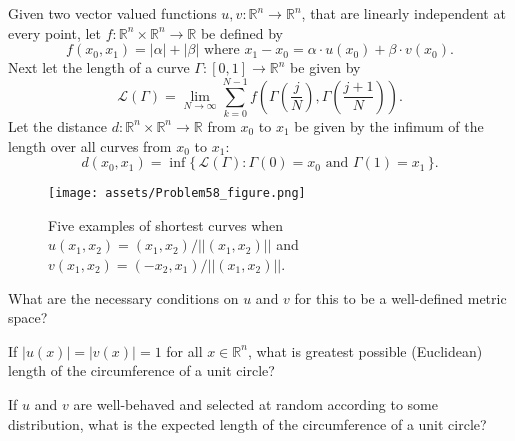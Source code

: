 \documentclass{article}
\begin{document}
  Given two vector valued functions
  $u, v\colon \mathbb{R}^n \rightarrow \mathbb{R}^n$, that are linearly
  independent at every point, let
  $f\colon \mathbb{R}^n \times \mathbb{R}^n \rightarrow \mathbb{R}$ be
  defined by \[
    f(x_0, x_1) = |\alpha| + |\beta| \text{ where }
    x_1 - x_0 = \alpha \cdot u(x_0) + \beta \cdot v(x_0).
  \]
  Next let the length of a curve $\Gamma\colon [0, 1] \rightarrow \mathbb{R}^n$
  be given by \[
    \mathcal{L}(\Gamma) = \lim_{N \rightarrow \infty} \sum_{k = 0}^{N - 1} f\left(
      \Gamma\left(\frac{j}{N}\right), \Gamma\left(\frac{j + 1}{N}\right)
    \right).
  \]
  Let the distance $d: \mathbb{R}^n \times \mathbb{R}^n \rightarrow \mathbb{R}$
  from $x_0$ to $x_1$ be given by the infimum of the length over all curves from
  $x_0$ to $x_1$: \[
    d(x_0, x_1) = \inf\{\,\mathcal{L}(\Gamma): \Gamma(0) = x_0 \text{ and } \Gamma(1) = x_1\,\}.
  \]
  \begin{figure}[ht!]
    \centering
    \texttt{[image: assets/Problem58\_figure.png]}
    \caption{
      Five examples of shortest curves when
      $u(x_1, x_2) = (x_1, x_2)/||(x_1, x_2)||$ and
      $v(x_1, x_2) = (-x_2, x_1)/||(x_1, x_2)||$.
    }
  \end{figure}
\begin{question}
  What are the necessary conditions on $u$ and $v$ for this to be a well-defined
  metric space?
\end{question}
\begin{related}
  \item If $|u(x)| = |v(x)| = 1$ for all $x \in \mathbb{R}^n$, what is greatest
    possible (Euclidean) length of the circumference of a unit circle?
  \item If $u$ and $v$ are well-behaved and selected at random according to some
    distribution, what is the expected length of the circumference of a unit
    circle?
\end{related}
\end{document}
